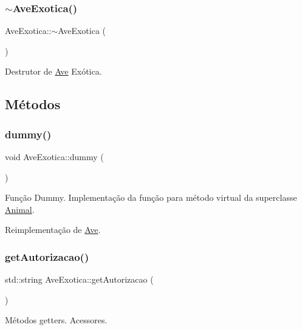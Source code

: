 \subsubsection{\texorpdfstring{$\sim$\+Ave\+Exotica()}{~AveExotica()}}
{\footnotesize\ttfamily Ave\+Exotica\+::$\sim$\+Ave\+Exotica (\begin{DoxyParamCaption}{ }\end{DoxyParamCaption})}

Destrutor de \hyperlink{classAve}{Ave} Exótica. 

\subsection{Métodos}
\mbox{\label{classAveExotica_add68b24041e28ade517eb42783da81a8}} 
\subsubsection{\texorpdfstring{dummy()}{dummy()}}
{\footnotesize\ttfamily void Ave\+Exotica\+::dummy (\begin{DoxyParamCaption}{ }\end{DoxyParamCaption})\hspace{0.3cm}{\ttfamily [virtual]}}

Função Dummy. Implementação da função para método virtual da superclasse \hyperlink{classAnimal}{Animal}. 

Reimplementação de \hyperlink{classAve_a9cf98dd6d66c29bc4d8e4f23992ead9c}{Ave}.

\mbox{\label{classAveExotica_acd164f3fa24cfabb458e5a94e056dde8}} 
\subsubsection{\texorpdfstring{get\+Autorizacao()}{getAutorizacao()}}
{\footnotesize\ttfamily std\+::string Ave\+Exotica\+::get\+Autorizacao (\begin{DoxyParamCaption}{ }\end{DoxyParamCaption})}

Métodos getters. Acessores. \mbox{\label{classAveExotica_a3e30ad3b8c8904e706072ce845f6a022}} 
